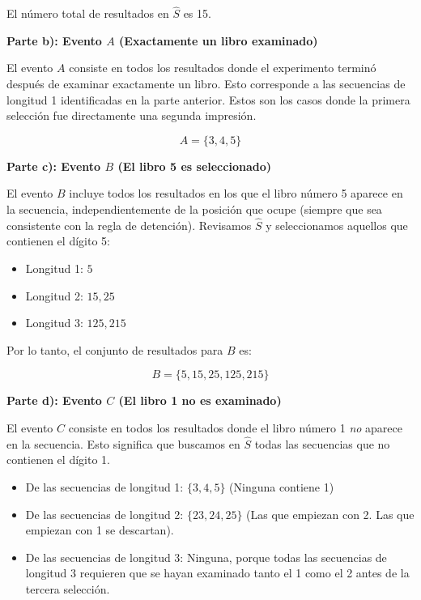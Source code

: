\documentclass[a4paper]{article}
\begin{document}
El número total de resultados en $\hat{S}$ es 15.

\vspace{0.3cm}

\textbf{Parte b): Evento $A$ (Exactamente un libro examinado)}

El evento $A$ consiste en todos los resultados donde el experimento terminó después de examinar exactamente un libro. Esto corresponde a las secuencias de longitud 1 identificadas en la parte anterior. Estos son los casos donde la primera selección fue directamente una segunda impresión.

$$ A = \{3, 4, 5\} $$

\vspace{0.3cm}

\textbf{Parte c): Evento $B$ (El libro 5 es seleccionado)}

El evento $B$ incluye todos los resultados en los que el libro número 5 aparece en la secuencia, independientemente de la posición que ocupe (siempre que sea consistente con la regla de detención). Revisamos $\hat{S}$ y seleccionamos aquellos que contienen el dígito 5:

\begin{itemize}
    \item Longitud 1: $5$
    \item Longitud 2: $15, 25$
    \item Longitud 3: $125, 215$
\end{itemize}

Por lo tanto, el conjunto de resultados para $B$ es:

$$ B = \{5, 15, 25, 125, 215\} $$

\vspace{0.3cm}

\textbf{Parte d): Evento $C$ (El libro 1 no es examinado)}

El evento $C$ consiste en todos los resultados donde el libro número 1 \textit{no} aparece en la secuencia. Esto significa que buscamos en $\hat{S}$ todas las secuencias que no contienen el dígito 1.

\begin{itemize}
    \item De las secuencias de longitud 1: $\{3, 4, 5\}$ (Ninguna contiene 1)
    \item De las secuencias de longitud 2: $\{23, 24, 25\}$ (Las que empiezan con 2. Las que empiezan con 1 se descartan).
    \item De las secuencias de longitud 3: Ninguna, porque todas las secuencias de longitud 3 requieren que se hayan examinado tanto el 1 como el 2 antes de la tercera selección.
\end{itemize}
\end{document}
